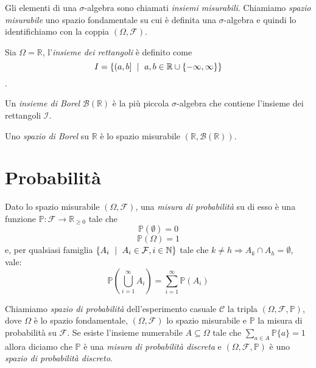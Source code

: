 Gli elementi di una $\sigma$-algebra sono chiamati \emph{insiemi misurabili}. Chiamiamo \emph{spazio misurabile} uno spazio fondamentale su cui è definita una $\sigma$-algebra e quindi lo identifichiamo con la coppia $(\Omega, \mathcal{F})$.

\begin{mtdef}
	Sia $\Omega=\mathbb{R}$, l'\emph{insieme dei rettangoli} è definito come $$ I = \{(a,b] \mbox{ }\mid\mbox{ } a,b\in \mathbb{R} \cup \{-\infty,\infty\}\} $$.
\end{mtdef}

\begin{mtdef}
	Un \emph{insieme di Borel} $\mathcal{B}(\mathbb{R})$ è la più piccola $\sigma$-algebra che contiene l'insieme dei rettangoli $\mathcal{I}$.
\end{mtdef}

\begin{mtdef}
	Uno \emph{spazio di Borel} su $\mathbb{R}$ è lo spazio misurabile $(\mathbb{R},\mathcal{B}(\mathbb{R}))$.
\end{mtdef}

\section{Probabilit\`a}

\begin{mtdef}
	Dato lo spazio misurabile $(\Omega,\mathcal{F})$, una \emph{misura di probabilità} su di esso è una funzione $\mathbb{P} : \mathcal{F} \rightarrow \mathbb{R}_{\geq 0}$ tale che
	\begin{equation}
		\mathbb{P}(\emptyset) = 0
	\end{equation}
	\begin{equation}
		\mathbb{P}(\Omega) = 1
	\end{equation}
	e, per qualsiasi famiglia $\{A_i \mbox{ }\mid\mbox{ } A_i \in \mathcal{F}, i \in \mathbb{N}\}$ tale che $k \neq h \Rightarrow A_k \cap A_h = \emptyset$, vale:
	\begin{equation}
		 \mathbb{P}\left(\bigcup_{i=1}^\infty A_i\right) = \sum_{i=1}^\infty \mathbb{P}\left(A_i\right)
	\end{equation}
\end{mtdef}

Chiamiamo \emph{spazio di probabilità} dell'esperimento casuale $\mathcal{C}$ la tripla $(\Omega, \mathcal{F}, \mathbb{P})$, dove $\Omega$ è lo spazio fondamentale, $(\Omega, \mathcal{F})$ lo spazio misurabile e $\mathbb{P}$ la misura di probabilità su $\mathcal{F}$.
Se esiste l'insieme numerabile $A \subseteq \Omega$ tale che $\sum_{a \in A} \mathbb{P}\{a\} = 1$ allora diciamo che $\mathbb{P}$ è una \emph{misura di probabilità discreta} e $(\Omega, \mathcal{F}, \mathbb{P})$ è uno \emph{spazio di probabilità discreto}.

